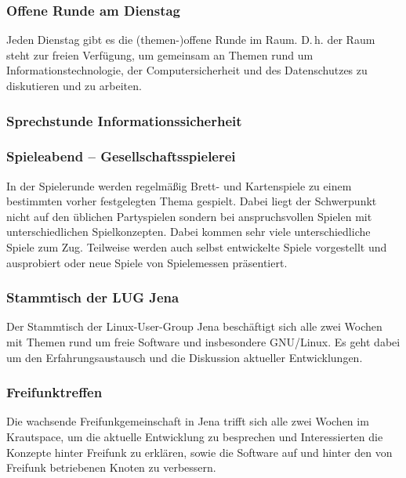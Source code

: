 \documentclass[10pt,DIV16]{scrartcl}
\begin{document}
\subsubsection{Offene Runde am Dienstag}

Jeden Dienstag gibt es die (themen-)offene Runde im Raum. D.\,h. der Raum
steht zur freien Verfügung, um gemeinsam an Themen rund um
Informationstechnologie, der Computersicherheit und des
Datenschutzes zu diskutieren und zu arbeiten.

\subsubsection{Sprechstunde Informationssicherheit}


\subsubsection{Spieleabend -- Gesellschaftsspielerei}

In der Spielerunde werden regelmäßig Brett- und Kartenspiele zu einem
bestimmten vorher festgelegten Thema gespielt. Dabei liegt der Schwerpunkt
nicht auf den üblichen Partyspielen sondern bei anspruchsvollen Spielen mit
unterschiedlichen Spielkonzepten. Dabei kommen sehr viele unterschiedliche
Spiele zum Zug. Teilweise werden auch selbst entwickelte Spiele vorgestellt
und ausprobiert oder neue Spiele von Spielemessen präsentiert.

\subsubsection{Stammtisch der LUG Jena}

Der Stammtisch der Linux-User-Group Jena beschäftigt sich alle zwei Wochen
mit Themen rund um freie Software und insbesondere GNU/Linux. Es geht dabei
um den Erfahrungsaustausch und die Diskussion aktueller Entwicklungen.

\subsubsection{Freifunktreffen}

Die wachsende Freifunkgemeinschaft in Jena trifft sich alle zwei Wochen
im Krautspace, um die aktuelle Entwicklung zu besprechen und
Interessierten die Konzepte hinter Freifunk zu erklären, sowie die
Software auf und hinter den von Freifunk betriebenen Knoten zu
verbessern.
\end{document}
